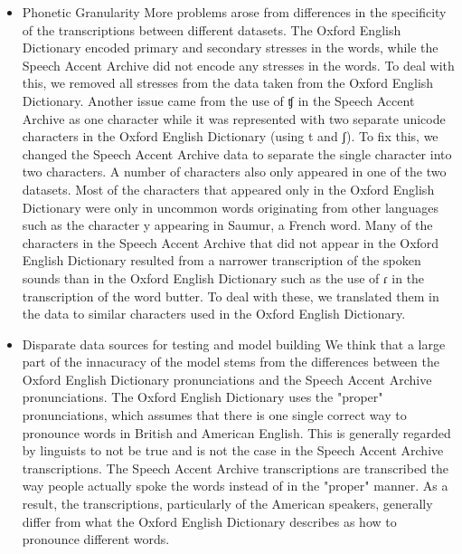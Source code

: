 \documentclass[11pt, letterpaper, oneside]{article}
\begin{document}
\begin{itemize}
\item Phonetic Granularity
    More problems arose from differences in the specificity of the transcriptions between different datasets.
    The Oxford English Dictionary encoded primary and secondary stresses in the words, while the Speech Accent Archive did not encode any stresses in the words.
    To deal with this, we removed all stresses from the data taken from the Oxford English Dictionary.
    Another issue came from the use of ʧ in the Speech Accent Archive as one character while it was represented with two separate unicode characters in the Oxford English Dictionary (using t and ʃ).
    To fix this, we changed the Speech Accent Archive data to separate the single character into two characters.
    A number of characters also only appeared in one of the two datasets.
    Most of the characters that appeared only in the Oxford English Dictionary were only in uncommon words originating from other languages such as the character y appearing in Saumur, a French word.
    Many of the characters in the Speech Accent Archive that did not appear in the Oxford English Dictionary resulted from a narrower transcription of the spoken sounds than in the Oxford English Dictionary such as the use of ɾ in the transcription of the word butter.
    To deal with these, we translated them in the data to similar characters used in the Oxford English Dictionary.

\item Disparate data sources for testing and model building
    We think that a large part of the innacuracy of the model stems from the differences between the Oxford English Dictionary pronunciations and the Speech Accent Archive pronunciations.
    The Oxford English Dictionary uses the "proper" pronunciations, which assumes that there is one single correct way to pronounce words in British and American English.
    This is generally regarded by linguists to not be true and is not the case in the Speech Accent Archive transcriptions.
    The Speech Accent Archive transcriptions are transcribed the way people actually spoke the words instead of in the "proper" manner.
    As a result, the transcriptions, particularly of the American speakers, generally differ from what the Oxford English Dictionary describes as how to pronounce different words.

\end{itemize}





\begin{thebibliography}{9}
\end{thebibliography}
\end{document}
